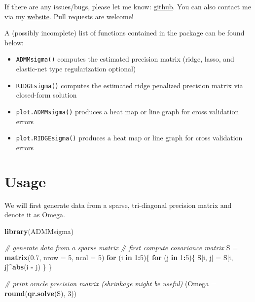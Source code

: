 \documentclass[12pt,]{book}
\newenvironment{Shaded}{\begin{snugshade}}{\end{snugshade}}
\newcommand{\CommentTok}[1]{\textcolor[rgb]{0.56,0.35,0.01}{\textit{#1}}}
\newcommand{\ControlFlowTok}[1]{\textcolor[rgb]{0.13,0.29,0.53}{\textbf{#1}}}
\newcommand{\DataTypeTok}[1]{\textcolor[rgb]{0.13,0.29,0.53}{#1}}
\newcommand{\DecValTok}[1]{\textcolor[rgb]{0.00,0.00,0.81}{#1}}
\newcommand{\FloatTok}[1]{\textcolor[rgb]{0.00,0.00,0.81}{#1}}
\newcommand{\KeywordTok}[1]{\textcolor[rgb]{0.13,0.29,0.53}{\textbf{#1}}}
\newcommand{\NormalTok}[1]{#1}
\newcommand{\OperatorTok}[1]{\textcolor[rgb]{0.81,0.36,0.00}{\textbf{#1}}}
\newcommand{\StringTok}[1]{\textcolor[rgb]{0.31,0.60,0.02}{#1}}
\theoremstyle{definition}
\theoremstyle{definition}
\theoremstyle{definition}
\theoremstyle{remark}
\begin{document}
\vspace{0.5cm}

If there are any issues/bugs, please let me know:
\href{https://github.com/MGallow/ADMMsigma/issues}{github}. You can also
contact me via my \href{https://mgallow.github.io/}{website}. Pull
requests are welcome!

\vspace{0.5cm}

A (possibly incomplete) list of functions contained in the package can
be found below:

\begin{itemize}
\item
  \texttt{ADMMsigma()} computes the estimated precision matrix (ridge,
  lasso, and elastic-net type regularization optional)
\item
  \texttt{RIDGEsigma()} computes the estimated ridge penalized precision
  matrix via closed-form solution
\item
  \texttt{plot.ADMMsigma()} produces a heat map or line graph for cross
  validation errors
\item
  \texttt{plot.RIDGEsigma()} produces a heat map or line graph for cross
  validation errors
\end{itemize}

\vspace{1cm}

\hypertarget{usage}{%
\section{Usage}\label{usage}}

We will first generate data from a sparse, tri-diagonal precision matrix
and denote it as Omega.

\vspace{0.5cm}

\begin{Shaded}
\begin{Highlighting}[]
\KeywordTok{library}\NormalTok{(ADMMsigma)}

\CommentTok{#  generate data from a sparse matrix}
\CommentTok{# first compute covariance matrix}
\NormalTok{S =}\StringTok{ }\KeywordTok{matrix}\NormalTok{(}\FloatTok{0.7}\NormalTok{, }\DataTypeTok{nrow =} \DecValTok{5}\NormalTok{, }\DataTypeTok{ncol =} \DecValTok{5}\NormalTok{)}
\ControlFlowTok{for}\NormalTok{ (i }\ControlFlowTok{in} \DecValTok{1}\OperatorTok{:}\DecValTok{5}\NormalTok{)\{}
  \ControlFlowTok{for}\NormalTok{ (j }\ControlFlowTok{in} \DecValTok{1}\OperatorTok{:}\DecValTok{5}\NormalTok{)\{}
\NormalTok{    S[i, j] =}\StringTok{ }\NormalTok{S[i, j]}\OperatorTok{^}\KeywordTok{abs}\NormalTok{(i }\OperatorTok{-}\StringTok{ }\NormalTok{j)}
\NormalTok{  \}}
\NormalTok{\}}

\CommentTok{# print oracle precision matrix (shrinkage might be useful)}
\NormalTok{(}\DataTypeTok{Omega =} \KeywordTok{round}\NormalTok{(}\KeywordTok{qr.solve}\NormalTok{(S), }\DecValTok{3}\NormalTok{))}
\end{Highlighting}
\end{Shaded}
\end{document}
